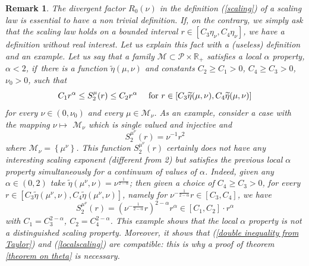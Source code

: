 \documentclass[11pt]{preprint}
\newtheorem{remark}[theorem]{Remark}
\begin{document}
\begin{remark}
\label{local property}The divergent factor $R_{0}\left(  \nu\right)  $ in the
definition (\ref{scaling}) of a scaling law is essential to have a non trivial
definition. If, on the contrary, we simply ask that the scaling law holds on a
bounded interval $r\in\left[  C_{3}\eta_{\nu},C_{4}\eta_{\nu}\right]  $, we
have a definition without real interest. Let us explain this fact with a
(useless) definition and an example. Let us say that a family $\mathcal{M}%
\subset\mathcal{P}\times\mathbb{R}_{+}$ satisfies a local $\alpha$ property,
$\alpha<2$, if\ there is a function $\widetilde{\eta}\left(  \mu,\nu\right)  $
and constants $C_{2}\geq C_{1}>0$, $C_{4}\geq C_{3}>0$, $\nu_{0}>0$, such
that
\begin{equation}
C_{1}r^{\alpha}\leq S_{2}^{\mu}\left(  r\right)  \leq C_{2}r^{\alpha}\text{
\quad for }r\in\left[  C_{3}\widetilde{\eta}\left(  \mu,\nu\right)
,C_{4}\widetilde{\eta}\left(  \mu,\nu\right)  \right]  \label{localscaling}%
\end{equation}
for every $\nu\in\left(  0,\nu_{0}\right)  $ and every $\mu\in\mathcal{M}%
_{\nu}$. As an example, consider a case with the mapping $\nu\longmapsto$
$\mathcal{M}_{\nu}$ which is single valued and injective and
\[
S_{2}^{\mu^{\nu}}\left(  r\right)  =\nu^{-1}r^{2}%
\]
where $\mathcal{M}_{\nu}=\left\{  \mu^{\nu}\right\}  $. This function
$S_{2}^{\mu^{\nu}}\left(  r\right)  $ certainly does not have any interesting
scaling exponent (different from 2) but satisfies the previous local $\alpha$
property simultaneously for a continuum of values of $\alpha$. Indeed, given
any $\alpha\in\left(  0,2\right)  $ take $\widetilde{\eta}\left(  \mu^{\nu
},\nu\right)  =\nu^{\frac{1}{2-\alpha}}$; then given a choice of $C_{4}\geq
C_{3}>0$, for every $r\in\left[  C_{3}\widetilde{\eta}\left(  \mu^{\nu}%
,\nu\right)  ,C_{4}\widetilde{\eta}\left(  \mu^{\nu},\nu\right)  \right]  $,
namely for $\nu^{-\frac{1}{2-\alpha}}r\in\left[  C_{3},C_{4}\right]  $, we
have
\[
S_{2}^{\mu^{\nu}}\left(  r\right)  =\left(  \nu^{-\frac{1}{2-\alpha}}r\right)
^{2-\alpha}r^{\alpha}\in\left[  C_{1},C_{2}\right]  \cdot r^{\alpha}%
\]
with $C_{1}=C_{3}^{2-\alpha}$, $C_{2}=C_{4}^{2-\alpha}$. This example shows
that the local $\alpha$ property is not a distinguished scaling property.
Moreover, it shows that (\ref{double inequality from Taylor}) and
(\ref{localscaling}) are compatible: this is why a proof of theorem
\ref{theorem on theta} is necessary.
\end{remark}
\end{document}
